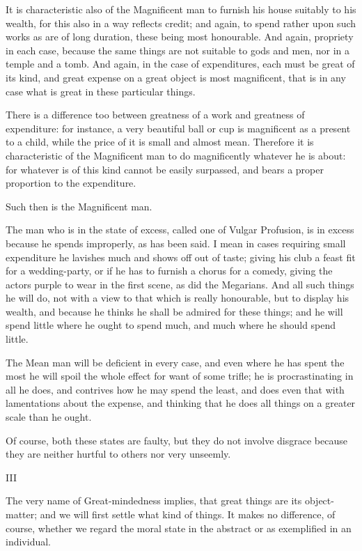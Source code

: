 It is characteristic also of the Magnificent man to furnish his house
suitably to his wealth, for this also in a way reflects credit; and
again, to spend rather upon such works as are of long duration, these
being most honourable. And again, propriety in each case, because the
same things are not suitable to gods and men, nor in a temple and a
tomb. And again, in the case of expenditures, each must be great of its
kind, and great expense on a great object is most magnificent, that is
in any case what is great in these particular things.

There is a difference too between greatness of a work and greatness of
expenditure: for instance, a very beautiful ball or cup is magnificent
as a present to a child, while the price of it is small and almost
mean. Therefore it is characteristic of the Magnificent man to do
magnificently whatever he is about: for whatever is of this kind cannot
be easily surpassed, and bears a proper proportion to the expenditure.

Such then is the Magnificent man.

The man who is in the state of excess, called one of Vulgar Profusion,
is in excess because he spends improperly, as has been said. I mean in
cases requiring small expenditure he lavishes much and shows off out of
taste; giving his club a feast fit for a wedding-party, or if he has to
furnish a chorus for a comedy, giving the actors purple to wear in the
first scene, as did the Megarians. And all such things he will do, not
with a view to that which is really honourable, but to display his
wealth, and because he thinks he shall be admired for these things; and
he will spend little where he ought to spend much, and much where he
should spend little.

The Mean man will be deficient in every case, and even where he has
spent the most he will spoil the whole effect for want of some trifle;
he is procrastinating in all he does, and contrives how he may spend
the least, and does even that with lamentations about the expense, and
thinking that he does all things on a greater scale than he ought.

Of course, both these states are faulty, but they do not involve
disgrace because they are neither hurtful to others nor very unseemly.

III

The very name of Great-mindedness implies, that great things are its
object-matter; and we will first settle what kind of things. It makes no
difference, of course, whether we regard the moral state in the abstract
or as exemplified in an individual.

